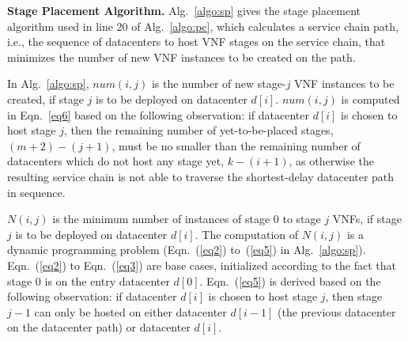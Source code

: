 \vspace{1mm}
\noindent\textbf{Stage Placement Algorithm.} Alg.~\ref{algo:sp} gives the stage placement algorithm used in line 20 of Alg.~\ref{algo:pc}, which calculates a service chain path, i.e., the sequence of datacenters to host VNF stages on the service chain, that minimizes the number of new VNF instances to be created on the path. %

In Alg.~\ref{algo:sp}, $num(i, j)$ is the number of new stage-$j$ VNF instances to be created, if stage $j$ is to be deployed on datacenter $d[i]$. $num(i, j)$ is computed in Eqn.~\ref{eq6} based on the following observation: if datacenter $d[i]$ is chosen to host stage $j$, then the remaining number of yet-to-be-placed stages, $(m+2)-(j+1)$, must be no smaller than the remaining number of datacenters which do not host any stage yet, $k-(i+1)$, as otherwise the resulting service chain is not able to traverse the shortest-delay datacenter path in sequence. %

$N(i, j)$ is the minimum number of instances of stage $0$ to stage $j$ VNFs, if stage $j$ is to be deployed on datacenter $d[i]$. The computation of $N(i, j)$ is a dynamic programming problem (Eqn.~(\ref{eq2}) to~(\ref{eq5}) in Alg.~\ref{algo:sp}). Eqn.~(\ref{eq2}) to Eqn.~(\ref{eq3}) are base cases, initialized according to the fact that stage $0$ is on the entry datacenter $d[0]$. Eqn.~(\ref{eq5}) is derived based on the following observation: if datacenter $d[i]$ is chosen to host stage $j$, then stage $j-1$ can only be hosted on either datacenter $d[i-1]$ (the previous datacenter on the datacenter path) or datacenter $d[i]$.




